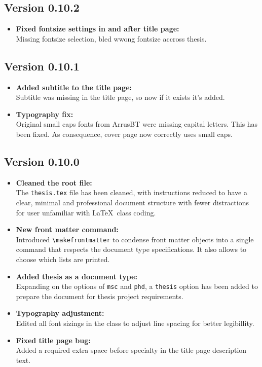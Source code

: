 \subsection{Version 0.10.2}
\begin{itemize}
\item \textbf{Fixed fontsize settings in and after title page:}\\
Missing fontsize selection, bled wwong fontsize accross thesis.

\end{itemize}

\subsection{Version 0.10.1}
\begin{itemize}
\item \textbf{Added subtitle to the title page:}\\
Subtitle was missing in the title page, so now if it exists it's added.

\item \textbf{Typography fix:}\\  
Original small caps fonts from ArrusBT were missing capital letters. This has been fixed. As consequence, cover page now correctly uses small caps.

\end{itemize}

\subsection{Version 0.10.0}
\begin{itemize}
\item \textbf{Cleaned the root file:}\\
The \texttt{thesis.tex} file has been cleaned, with instructions reduced to have a clear,
minimal and professional document structure with fewer distractions for user unfamiliar with \LaTeX\ class coding.

\item \textbf{New front matter command:}\\  
Introduced \texttt{\textbackslash makefrontmatter} to condense front matter objects into a single command that respects the document type specifications. It also allows to choose which lists are printed.

\item \textbf{Added thesis as a document type:}\\  
Expanding on the options of \texttt{msc} and \texttt{phd}, a \texttt{thesis} option has been added to prepare the document for thesis project requirements.

\item \textbf{Typography adjustment:}\\  
Edited all font sizings in the class to adjust line spacing for better legibillity.

\item \textbf{Fixed title page bug:}\\  
Added a required extra space before specialty in the title page description text.
\end{itemize}

